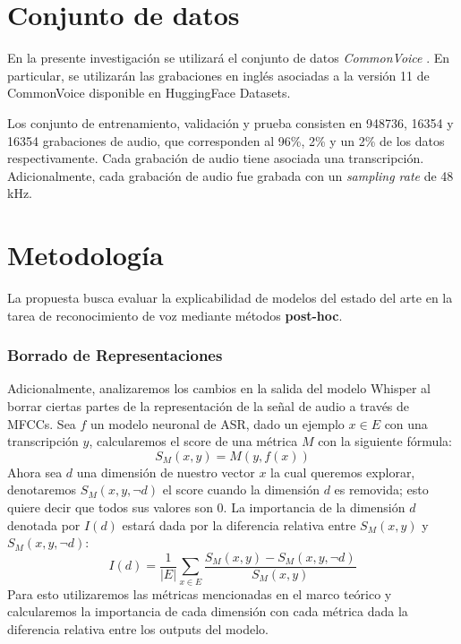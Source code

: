 \documentclass[conference]{IEEEtran}
\begin{document}
\section{Conjunto de datos} \label{4-Dataset}

En la presente investigación se utilizará el conjunto de datos \textit{CommonVoice} \cite{commonvoice:2020}. En particular, se utilizarán las grabaciones en inglés asociadas a la versión 11 de CommonVoice disponible en HuggingFace Datasets.

Los conjunto de entrenamiento, validación y prueba consisten en 948736, 16354 y 16354 grabaciones de audio, que corresponden al 96\%, 2\% y un 2\% de los datos respectivamente. Cada grabación de audio tiene asociada una transcripción. Adicionalmente, cada grabación de audio fue grabada con un \textit{sampling rate} de 48 kHz.

\section{Metodología} \label{5-Methodology}

La propuesta busca evaluar la explicabilidad de modelos del estado del arte en la tarea de reconocimiento de voz mediante métodos \textbf{post-hoc}.

\subsubsection{Borrado de Representaciones}
Adicionalmente, analizaremos los cambios en la salida del modelo Whisper al borrar ciertas partes de la representación de la señal de audio a través de MFCCs.
Sea $f$ un modelo neuronal de ASR, dado un ejemplo $x \in E$ con una transcripción $y$, calcularemos el score de una métrica $M$ con la siguiente fórmula:
\begin{equation}
    S_{M}(x,y) = M(y, f(x))
\end{equation}
Ahora sea $d$ una dimensión de nuestro vector $x$ la cual queremos explorar, denotaremos $S_{M}(x,y,\neg d)$ el score cuando la dimensión $d$ es removida; esto quiere decir que todos sus valores son 0.
La importancia de la dimensión $d$ denotada por $I(d)$ estará dada por la diferencia relativa entre $S_{M}(x,y)$ y $S_{M}(x,y,\neg d)$:
\begin{equation} \label{eq:imp}
    I(d) = \frac{1}{|E|} \sum_{x \in E} \frac{S_{M}(x,y) - S_{M}(x,y,\neg d)}{S_{M}(x,y)}
\end{equation}
Para esto utilizaremos las métricas mencionadas en el marco teórico y calcularemos la importancia de cada dimensión con cada métrica dada la diferencia relativa entre los outputs del modelo.
\end{document}
